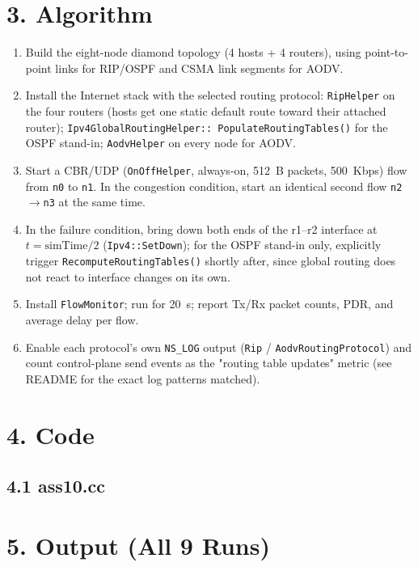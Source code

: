 \documentclass[11pt]{article}
\begin{document}
\section*{3. Algorithm}
\begin{enumerate}
  \item Build the eight-node diamond topology (4 hosts + 4 routers), using
        point-to-point links for RIP/OSPF and CSMA link segments for AODV.
  \item Install the Internet stack with the selected routing protocol:
        \texttt{RipHelper} on the four routers (hosts get one static default
        route toward their attached router); \texttt{Ipv4GlobalRoutingHelper::
        PopulateRoutingTables()} for the OSPF stand-in; \texttt{AodvHelper} on
        every node for AODV.
  \item Start a CBR/UDP (\texttt{OnOffHelper}, always-on, 512~B packets,
        500~Kbps) flow from \texttt{n0} to \texttt{n1}. In the congestion
        condition, start an identical second flow \texttt{n2}$\to$\texttt{n3}
        at the same time.
  \item In the failure condition, bring down both ends of the r1--r2
        interface at $t = \text{simTime}/2$ (\texttt{Ipv4::SetDown}); for the
        OSPF stand-in only, explicitly trigger
        \texttt{RecomputeRoutingTables()} shortly after, since global routing
        does not react to interface changes on its own.
  \item Install \texttt{FlowMonitor}; run for 20~s; report Tx/Rx packet
        counts, PDR, and average delay per flow.
  \item Enable each protocol's own \texttt{NS\_LOG} output
        (\texttt{Rip} / \texttt{AodvRoutingProtocol}) and count control-plane
        send events as the "routing table updates" metric (see README for the
        exact log patterns matched).
\end{enumerate}

\section*{4. Code}
\subsection*{4.1 ass10.cc}


\section*{5. Output (All 9 Runs)}

\end{document}

